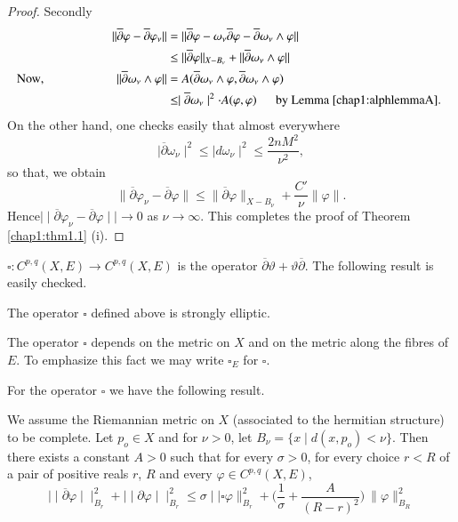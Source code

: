 \begin{proof}
Secondly
\begin{align*}
  \| {\overline{\partial}} \varphi - {\overline{\partial}} \varphi_\nu
  \| &= \| {\overline{\partial}} \varphi - \omega_\nu
     {\overline{\partial}} \varphi - {\overline{\partial}} \omega_\nu
     \wedge \varphi \| \\ 
     &\leq \| {\overline{\partial}} \varphi \| _ {X-B_\nu} + \|
     {\overline{\partial}}\omega_\nu \wedge \varphi \|\\ 
  \text{Now}, \hspace{2cm} \| \overline{\partial} \omega_{\nu} \wedge
  \varphi \| &= A({\overline{\partial}}\omega_\nu \wedge \varphi,
   {\overline{\partial}} \omega_\nu \wedge \varphi) \\ 
   &\leq \mid {\overline{\partial}}\omega_\nu \mid^2 \cdot A(\varphi ,
   \varphi) \quad  \text{\; by Lemma \ref{chap1:alphlemmaA}. }
\end{align*}
On the other hand, one checks easily that almost everywhere
$$
\mid {\overline{\partial}}\omega_\nu \mid^2 \leq \mid d \omega_\nu
\mid^2 \leq \frac{2nM^2}{\nu^2},
$$ 
so that, we obtain
$$ 
\| {\overline{\partial}} \varphi_\nu - {\overline{\partial}} \varphi 
\| \leq \| {\overline{\partial}} \varphi\|_ {X-B_\nu} +
\frac{C'}{\nu} \| \varphi \|.
$$
Hence\pageoriginale $\mid \mid \overline{\partial} \varphi_\nu -
\overline{\partial}\varphi \mid \mid \rightarrow 0 $ as $\nu \rightarrow
\infty $. This completes the proof of Theorem \ref{chap1:thm1.1} (i). 
\end{proof}

\begin{definition}%
  $\square : C^{p,q}(X,E)\rightarrow C^{p,q}(X,E)$ is the operator
  $\overline{\partial}\vartheta + \vartheta \overline{\partial}$. The
  following result is easily checked. 
\end{definition}

\begin{lemma}%
  The operator $\square$ defined above is strongly elliptic.
\end{lemma}

The operator $\square$ depends on the metric on $X$ and on the metric
along the fibres of $E$. To emphasize this fact we may write
$\square_E$ for $\square$. 

For the operator $\square$ we have the following result.

\begin{theorem}\label{chap1:thm1.2}%
  We assume the Riemannian metric on $X$  (associated to the hermitian
  structure) to be complete. Let $p_o \in X$ and for $\nu>0$, let
  $B_\nu=\{x \mid d(x,p_o)<\nu \}$. Then there exists a constant $A>0$
  such that for every $\sigma >0$, for every choice $r<R$ of a pair of
  positive reals $r$, $R$ and every $\varphi \in C^{p,q}(X,E)$, 
  $$
  \mid \mid \overline{\partial}\varphi \mid \mid ^2_{B_{r}} + \mid
  \mid \partial \varphi \mid \mid^2_{B_{r}}\leq \sigma \mid \mid
  \square \varphi \|^2_ {B_{r}}+ \bigg (\frac{1}{\sigma}+
  \frac{A}{(R-r)^2}\bigg)\ \| \varphi \|^2 _{B_{R}} 
  $$
\end{theorem}

